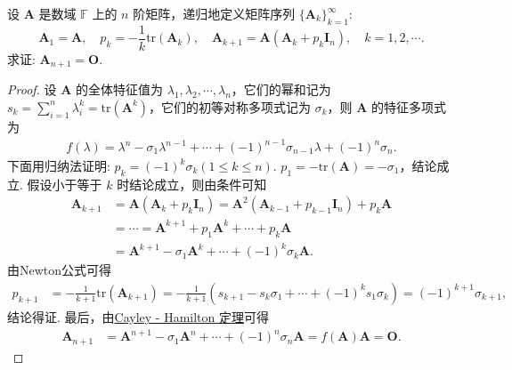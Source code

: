 \documentclass[../../main.tex]{subfiles}%
\begin{document}
\begin{example}
设 $\boldsymbol{A}$ 是数域 $\mathbb{F}$ 上的 $n$ 阶矩阵，递归地定义矩阵序列 $\{\boldsymbol{A}_k\}_{k = 1}^{\infty}$:
\[
\boldsymbol{A}_1=\boldsymbol{A}, \quad
p_k=-\frac{1}{k}\mathrm{tr}(\boldsymbol{A}_k), \quad
\boldsymbol{A}_{k + 1}=\boldsymbol{A}(\boldsymbol{A}_k + p_k\boldsymbol{I}_n), \quad k = 1,2,\cdots.
\]
求证: $\boldsymbol{A}_{n + 1}=\boldsymbol{O}$.
\end{example}
\begin{proof}
设 $\boldsymbol{A}$ 的全体特征值为 $\lambda_1,\lambda_2,\cdots,\lambda_n$，它们的幂和记为 $s_k=\sum_{i = 1}^{n}\lambda_i^k=\mathrm{tr}(\boldsymbol{A}^k)$，它们的初等对称多项式记为 $\sigma_k$，则 $\boldsymbol{A}$ 的特征多项式为
\begin{align*}
f(\lambda)=\lambda^n - \sigma_1\lambda^{n - 1}+\cdots + (-1)^{n - 1}\sigma_{n - 1}\lambda + (-1)^n\sigma_n.
\end{align*}
下面用归纳法证明: $p_k = (-1)^k\sigma_k (1\leqslant  k\leqslant  n)$. $p_1 = -\mathrm{tr}(\boldsymbol{A}) = -\sigma_1$，结论成立. 假设小于等于 $k$ 时结论成立，则由条件可知
\begin{align*}
\boldsymbol{A}_{k+1}&=\boldsymbol{A}\left( \boldsymbol{A}_k+p_k\boldsymbol{I}_n \right) =\boldsymbol{A}^2\left( \boldsymbol{A}_{k-1}+p_{k-1}\boldsymbol{I}_n \right) +p_k\boldsymbol{A}
\\
&=\cdots =\boldsymbol{A}^{k+1}+p_1\boldsymbol{A}^k+\cdots +p_k\boldsymbol{A}
\\
&=\boldsymbol{A}^{k+1}-\sigma _1\boldsymbol{A}^k+\cdots +(-1)^k\sigma _k\boldsymbol{A}.
\end{align*}
由Newton公式可得
\begin{align*}
p_{k + 1}&=-\frac{1}{k + 1}\mathrm{tr}(\boldsymbol{A}_{k + 1})=-\frac{1}{k + 1}(s_{k + 1} - s_k\sigma_1+\cdots + (-1)^k s_1\sigma_k)=(-1)^{k + 1}\sigma_{k + 1},
\end{align*}
结论得证. 最后，由\hyperref[theorem:Cayley-Hamilton定理]{Cayley - Hamilton 定理}可得
\begin{align*}
\boldsymbol{A}_{n + 1}&=\boldsymbol{A}^{n + 1} - \sigma_1\boldsymbol{A}^n+\cdots + (-1)^n\sigma_n\boldsymbol{A}=f(\boldsymbol{A})\boldsymbol{A}=\boldsymbol{O}.
\end{align*} 
\end{proof}
\end{document}
